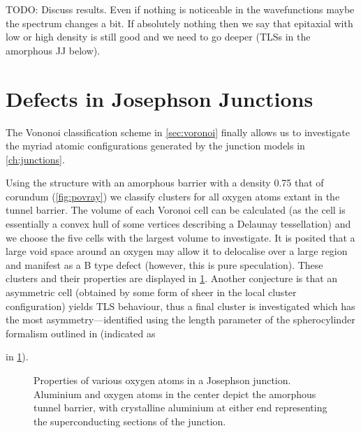 TODO: Discuss results.
Even if nothing is noticeable in the wavefunctions maybe the spectrum changes a bit.
If absolutely nothing then we say that epitaxial with low or high density is still good and we need to go deeper (TLSs in the amorphous JJ below).

\section{Defects in Josephson Junctions}\label{sec:jjtls}

The Vononoi classification scheme in \cref{sec:voronoi} finally allows us to investigate the myriad atomic configurations generated by the junction models in \cref{ch:junctions}.

Using the structure with an  amorphous barrier with a density 0.75 that of corundum (\cref{fig:povray}) we classify clusters for all oxygen atoms extant in the tunnel barrier.
The volume of each Voronoi cell can be calculated (as the cell is essentially a convex hull of some vertices describing a Delaunay tessellation) and we choose the five cells with the largest volume to investigate.
It is posited that a large void space around an oxygen may allow it to delocalise over a large region and manifest as a B type defect (however, this is pure speculation).
These clusters and their properties are displayed in \cref{fig:tlsinjj}.
Another conjecture is that an asymmetric cell (obtained by some form of sheer in the local cluster configuration) yields TLS behaviour, thus a final cluster is investigated which has the most asymmetry---identified using the length parameter of the spherocylinder formalism outlined in  (indicated as  in \cref{fig:tlsinjj}).

\begin{figure}[htp]
\tlsjjmargins
\begin{adjustwidth}{\tlsjjleft}{\tlsjjright}
\resizebox{\widefigure}{!}{}
  \caption[Oxygen Properties in a Josephson Junction]{\label{fig:tlsinjj}Properties of various oxygen atoms in a Josephson junction. Aluminium  and oxygen  atoms in the center depict the amorphous tunnel barrier, with crystalline aluminium at either end representing the superconducting sections of the junction.}
\end{adjustwidth}
\end{figure}

